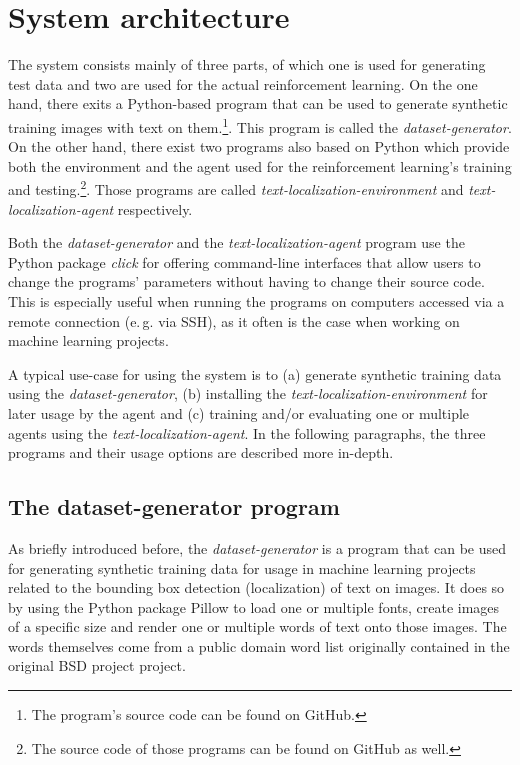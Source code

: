 \section{System architecture}

The system consists mainly of three parts, of which one is used for generating test data and two are used for the actual reinforcement learning.
On the one hand, there exits a Python-based program that can be used to generate synthetic training images with text on them.\footnote{The program's source code can be found on GitHub.\cite{GitHubDatasetGenerator}}. 
This program is called the \textit{dataset-generator}.
On the other hand, there exist two programs also based on Python which provide both the environment and the agent used for the reinforcement learning's training and testing.\footnote{The source code of those programs can be found on GitHub as well.\cite{GitHubTextLocalizationEnvironment}\cite{GitHubTextLocalizationAgent}}. 
Those programs are called \textit{text-localization-environment} and \textit{text-localization-agent} respectively. 

Both the \textit{dataset-generator} and the \textit{text-localization-agent} program use the Python package \textit{click}\cite{PythonPackageClick} for offering command-line interfaces that allow users to change the programs' parameters without having to change their source code.
This is especially useful when running the programs on computers accessed via a remote connection (e.\,g. via SSH), as it often is the case when working on machine learning projects.

A typical use-case for using the system is to (a) generate synthetic training data using the \textit{dataset-generator}, (b) installing the \textit{text-localization-environment} for later usage by the agent and (c) training and/or evaluating one or multiple agents using the \textit{text-localization-agent}. 
In the following paragraphs, the three programs and their usage options are described more in-depth.

\subsection{The dataset-generator program}\label{sec:dataset-generator}

As briefly introduced before, the \textit{dataset-generator} is a program that can be used for generating synthetic training data for usage in machine learning projects related to the bounding box detection (localization) of text on images. 
It does so by using the Python package Pillow\cite{PythonPackagePillow} to load one or multiple fonts, create images of a specific size and render one or multiple words of text onto those images.
The words themselves come from a public domain word list originally contained in the original BSD project project.\cite{BSDWordlist}

